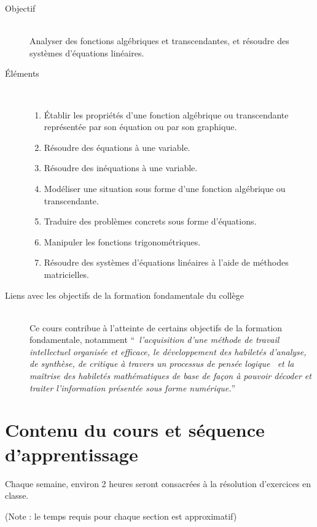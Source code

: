 \documentclass[fleqn,twoside,12pt,letterpaper]{article}
\begin{document}
  \begin{description}
    \item[Objectif]\ \\
    Analyser des fonctions algébriques et
	transcendantes, et résoudre des systèmes d'équations linéaires.
    \item[Éléments]\ 
    \begin{enumerate}
      \item Établir les propriétés d'une fonction algébrique ou transcendante
			représentée par son équation ou par son graphique.
      \item Résoudre des équations à une variable.
	  \item Résoudre des inéquations à une variable.
	  \item Modéliser une situation sous forme d'une fonction algébrique ou
			transcendante.
	  \item Traduire des problèmes concrets sous forme d'équations.
	  \item Manipuler les fonctions trigonométriques.
	  \item Résoudre des systèmes d'équations linéaires à l'aide de méthodes
			matricielles.
    \end{enumerate}
    \item[Liens avec les objectifs de la formation fondamentale du collège]\ \\
	  Ce cours contribue à l'atteinte de certains objectifs de la formation
	  fondamentale, notamment ``\emph{ l'acquisition d'une méthode de travail
	  intellectuel organisée et efficace, le développement des habiletés
	  d'analyse, de synthèse, de critique à travers un processus de pensée
	  logique  et la maîtrise des habiletés mathématiques de base de façon à
	  pouvoir décoder et traiter l'information présentée sous forme numérique.}''
  \end{description}


\section{Contenu du cours et séquence d'apprentissage}

  Chaque semaine, environ 2 heures seront consacrées à la
  résolution d'exercices en classe. 

  (Note : le temps requis pour chaque section est approximatif)
\end{document}
